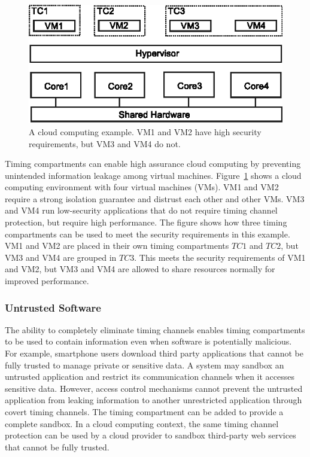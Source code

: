\begin{figure}
    \begin{center}
        \includegraphics{figs/cloud_tcs.eps}
        \caption{A cloud computing example. VM1 and VM2 have high security 
        requirements, but VM3 and VM4 do not.}
        \label{fig:cloud_tcs}
    \end{center}
\end{figure}

Timing compartments can enable high assurance cloud computing by preventing
unintended information leakage among virtual machines.
Figure~\ref{fig:cloud_tcs} shows a cloud computing environment with four virtual 
machines (VMs).
VM1 and VM2 require a strong isolation guarantee and distrust each other and 
other VMs.
VM3 and VM4 run low-security applications that do not require timing channel 
protection, but require high performance. The figure shows how three timing 
compartments can be used to meet the security requirements in this example.
VM1 and VM2 are placed in their own timing compartments $TC1$ and $TC2$, but VM3 
and VM4 are grouped in $TC3$. 
This meets the 
security requirements of VM1 and VM2, but VM3 and VM4 are allowed to share 
resources normally for improved performance.


\subsubsection{Untrusted Software} 

The ability to completely eliminate timing channels enables timing compartments
to be used to contain information even when software is potentially malicious.
For example, smartphone users download third party applications
that cannot be fully trusted to manage private or sensitive data. A system may
sandbox an untrusted application and restrict its communication channels
when it accesses sensitive data. However, access control mechanisms cannot
prevent the untrusted application from leaking information to another 
unrestricted
application through covert timing channels. The timing compartment can 
be added to provide a complete sandbox.  In a cloud computing
context, the same timing channel protection can be used
by a cloud provider to sandbox third-party web services that cannot be fully 
trusted.

